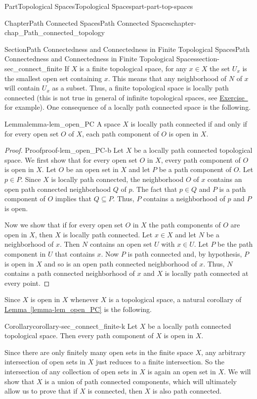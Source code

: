 \documentclass[oneside,10pt,]{book}
\newcommand{\xreffont}{\relax}
\numberwithin{equation}{chapter}
\begin{document}
\begin{partptx}{Part}{Topological Spaces}{}{Topological Spaces}{}{}{part-part-top-spaces}
\begin{chapterptx}{Chapter}{Path Connected Spaces}{}{Path Connected Spaces}{}{}{chapter-chap_Path_connected_topology}
\begin{sectionptx}{Section}{Path Connectedness and Connectedness in Finite Topological Spaces}{}{Path Connectedness and Connectedness in Finite Topological Spaces}{}{}{section-sec_connect_finite}
If \(X\) is a finite topological space, for any \(x \in X\) the set \(U_x\) is the smallest open set containing \(x\). This means that any neighborhood of \(N\) of \(x\) will contain \(U_x\) as a subset. Thus, a finite topological space is locally path connected (this is not true in general of infinite topological spaces, see \hyperlink{exercise-ex_PC_harmonic_broom}{Exercise~{\xreffont 4}} for example). One consequence of a locally path connected space is the following.%
\begin{lemma}{Lemma}{}{}{lemma-lem_open_PC}%
A space \(X\) is locally path connected if and only if for every open set \(O\) of \(X\), each path component of \(O\) is open in \(X\).%
\end{lemma}
\begin{proof}{Proof}{}{proof-lem_open_PC-b}
Let \(X\) be a locally path connected topological space. We first show that for every open set \(O\) in \(X\), every path component of \(O\) is open in \(X\). Let \(O\) be an open set in \(X\) and let \(P\) be a path component of \(O\). Let \(p \in P\). Since \(X\) is locally path connected, the neighborhood \(O\) of \(x\) contains an open path connected neighborhood \(Q\) of \(p\). The fact that \(p \in Q\) and \(P\) is a path component of \(O\) implies that \(Q \subseteq P\). Thus, \(P\) contains a neighborhood of \(p\) and \(P\) is open.%
\par
Now we show that if for every open set \(O\) in \(X\) the path components of \(O\) are open in \(X\), then \(X\) is locally path connected. Let \(x \in X\) and let \(N\) be a neighborhood of \(x\). Then \(N\) contains an open set \(U\) with \(x \in U\). Let \(P\) be the path component in \(U\) that contains \(x\). Now \(P\) is path connected and, by hypothesis, \(P\) is open in \(X\) and so is an open path connected neighborhood of \(x\). Thus, \(N\) contains a path connected neighborhood of \(x\) and \(X\) is locally path connected at every point.%
\end{proof}
Since \(X\) is open in \(X\) whenever \(X\) is a topological space, a natural corollary of \hyperref[lemma-lem_open_PC]{Lemma~{\xreffont\ref{lemma-lem_open_PC}}} is the following.%
\begin{corollary}{Corollary}{}{}{corollary-sec_connect_finite-k}%
Let \(X\) be a locally path connected topological space. Then every path component of \(X\) is open in \(X\).%
\end{corollary}
Since there are only finitely many open sets in the finite space \(X\), any arbitrary intersection of open sets in \(X\) just reduces to a finite intersection. So the intersection of any collection of open sets in \(X\) is again an open set in \(X\). We will show that \(X\) is a union of path connected components, which will ultimately allow us to prove that if \(X\) is connected, then \(X\) is also path connected.%

\end{sectionptx}
\end{chapterptx}
\end{partptx}
\end{document}
